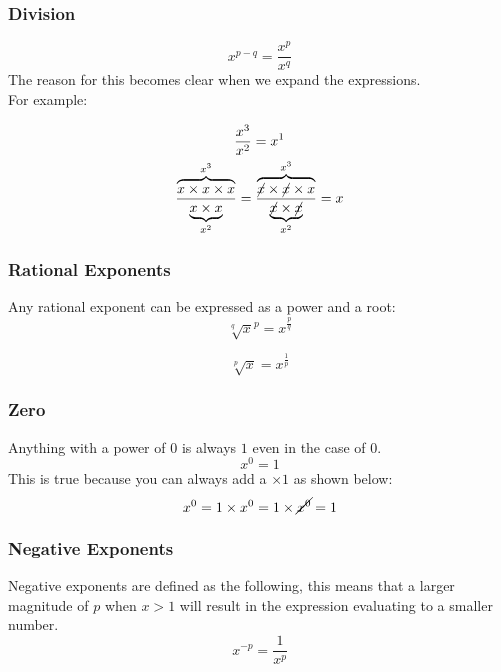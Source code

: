 \documentclass{article}
\begin{document}
\subsubsection{Division}

\begin{equation}
	\label{simple_equation}
	x^{p - q} = \frac{x^{p}}{x^{q}}
\end{equation}
The reason for this becomes clear when we expand the expressions.
\\
For example:

\begin{gather*}
	\frac{x^3}{x^2} = x^1\\
	\frac{\overbrace{x \times x \times x}^{x^3}}{\underbrace{x \times x}_{x^2}} =
	\frac{\overbrace{\cancel{x} \times \cancel{x} \times x}^{x^3}}{\underbrace{\cancel{x} \times \cancel{x}}_{x^2}} =
	x
\end{gather*}
\subsubsection{Rational Exponents}
Any rational exponent can be expressed as a power and a root:
\begin{equation}
	\label{simple_equation}
	\sqrt[q]{x}^{p} = x^{\frac{p}{q}}
\end{equation}


\begin{equation}
	\label{simple_equation}
	\sqrt[p]{x} = x^{\frac{1}{p}}
\end{equation}

\subsubsection{Zero}
Anything with a power of $0$ is always $1$ even in the case of $0$.
\begin{equation}
	\label{simple_equation}
	x^0 = 1
\end{equation}
This is true because you can always add a $\times 1$ as shown below:
\begin{equation}
	x^0 = 1 \times x^0 = 1 \times \cancel{x^0} = 1
\end{equation}

\subsubsection{Negative Exponents}
Negative exponents are defined as the following, this means that a larger magnitude of $p$ when $x>1$
will result in the expression evaluating to a smaller number.
\begin{equation}
	\label{simple_equation}
	x^{-p} = \frac{1}{x^p}
\end{equation}
\end{document}

